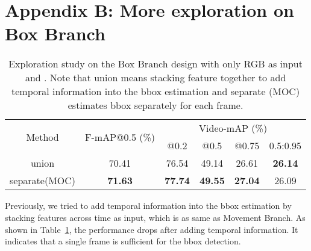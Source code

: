 \documentclass[runningheads]{llncs}
\begin{document}
\section*{Appendix B: More exploration on Box Branch}
\begin{table}
  \caption{Exploration study on the Box Branch design with only RGB as input and . Note that union means stacking feature together to add temporal information into the bbox estimation and separate (MOC) estimates bbox separately for each frame.}
    \label{tbl:box}
  \begin{center}
\begin{tabular}{c|c|cccc}
  \hline
  \multirow{2}{*}{Method}&\multirow{2}{*}{F-mAP@0.5 (\%)}&\multicolumn{4}{c}{Video-mAP (\%)} \\
  \cline{3-6}
  \iftrue
  & & @0.2 & @0.5 & @0.75 & 0.5:0.95\\
  \hline
  union&70.41&76.54&49.14&26.61&\bf26.14\\
  separate(MOC)&\bf 71.63&\bf 77.74&\bf 49.55&\bf 27.04&26.09\\
  \fi
  \hline
  \end{tabular}
\end{center}
\end{table}

Previously, we tried to add temporal information into the bbox estimation by stacking features across time as input, which is as same as Movement Branch. As shown in Table~\ref{tbl:box}, the performance drops after adding temporal information. It indicates that a single frame is sufficient for the bbox detection.
\end{document}
